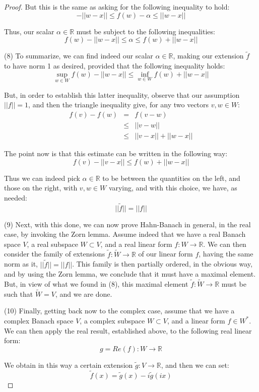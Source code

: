 \documentclass[12pt]{amsbook}
\begin{document}
\begin{proof}
But this is the same as asking for the following inequality to hold:
$$-||w-x||\leq f(w)-\alpha\leq||w-x||$$

Thus, our scalar $\alpha\in\mathbb R$ must be subject to the following inequalities:
$$f(w)-||w-x||\leq \alpha\leq f(w)+||w-x||$$

(8) To summarize, we can find indeed our scalar $\alpha\in\mathbb R$, making our extension $\tilde{f}$ to have norm 1 as desired, provided that the following inequality holds:
$$\sup_{w\in W}f(w)-||w-x||\leq\inf_{w\in W}f(w)+||w-x||$$

But, in order to establish this latter inequality, observe that our assumption $||f||=1$, and then the triangle inequality give, for any two vectors $v,w\in W$:
\begin{eqnarray*}
f(v)-f(w)
&=&f(v-w)\\
&\leq&||v-w||\\
&\leq&||v-x||+||w-x||
\end{eqnarray*}

The point now is that this estimate can be written in the following way:
$$f(v)-||v-x||\leq f(w)+||w-x||$$

Thus we can indeed pick $\alpha\in\mathbb R$ to be between the quantities on the left, and those on the right, with $v,w\in W$ varying, and with this choice, we have, as needed:
$$||\tilde{f}||=||f||$$

(9) Next, with this done, we can now prove Hahn-Banach in general, in the real case, by invoking the Zorn lemma. Assume indeed that we have a real Banach space $V$, a real subspace $W\subset V$, and a real linear form $f:W\to\mathbb R$. We can then consider the family of extensions $\tilde{f}:\tilde{W}\to\mathbb R$ of our linear form $f$, having the same norm as it, $||\tilde{f}||=||f||$. This family is then partially ordered, in the obvious way, and by using the Zorn lemma, we conclude that it must have a maximal element. But, in view of what we found in (8), this maximal element $\tilde{f}:\tilde{W}\to\mathbb R$ must be such that $\tilde{W}=V$, and we are done.

\medskip

(10) Finally, getting back now to the complex case, assume that we have a complex Banach space $V$, a complex subspace $W\subset V$, and a linear form $f\in W^*$. We can then apply the real result, established above, to the following real linear form:
$$g=Re(f):W\to\mathbb R$$

We obtain in this way a certain extension $\tilde{g}:V\to\mathbb R$, and then we can set:
$$\tilde{f}(x)=\tilde{g}(x)-i\tilde{g}(ix)$$


\end{proof}
\end{document}

